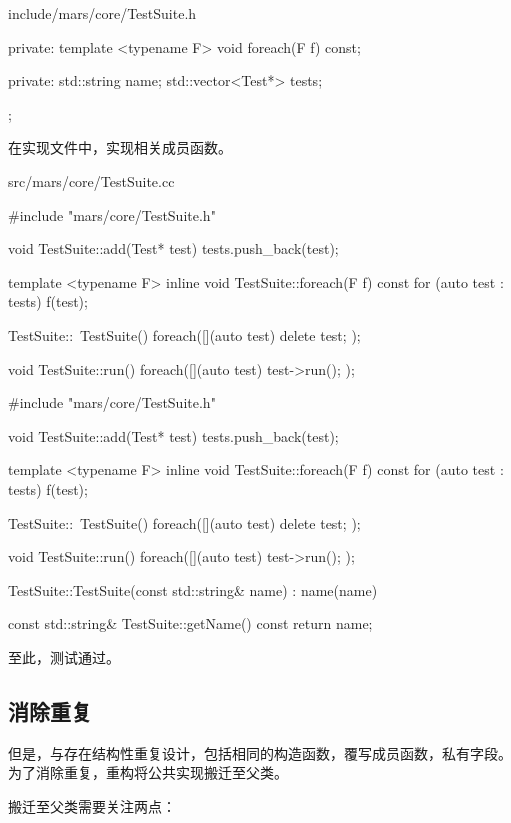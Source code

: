 \begin{content}
\begin{diff}{include/mars/core/TestSuite.h}
\begin{minicpp}
{private:
  template <typename F>
  void foreach(F f) const;

private:
  std::string name;
  std::vector<Test*> tests;
};
 \end{minicpp}
\end{diff}

在实现文件中，实现相关成员函数。

\begin{diff}{src/mars/core/TestSuite.cc}
 \begin{minicpp}
#include "mars/core/TestSuite.h"

void TestSuite::add(Test* test) {
  tests.push_back(test);
}

template <typename F>
inline void TestSuite::foreach(F f) const {
  for (auto test : tests) {
    f(test);
  }
}

TestSuite::~TestSuite() {
  foreach([](auto test) {
    delete test;
  });
}

void TestSuite::run() {
  foreach([](auto test) {
    test->run();
  });
}
 \end{minicpp}
\tcblower
 \begin{minicpp}
#include "mars/core/TestSuite.h"

void TestSuite::add(Test* test) {
  tests.push_back(test);
}

template <typename F>
inline void TestSuite::foreach(F f) const {
  for (auto test : tests) {
    f(test);
  }
}

TestSuite::~TestSuite() {
  foreach([](auto test) {
    delete test;
  });
}

void TestSuite::run() {
  foreach([](auto test) {
    test->run();
  });
}

TestSuite::TestSuite(const std::string& name)
  : name(name) {
}

const std::string& TestSuite::getName() const {
  return name;
}
 \end{minicpp}
\end{diff}

至此，测试通过。

\subsection{消除重复}

但是，与存在结构性重复设计，包括相同的构造函数，覆写成员函数，私有字段。为了消除重复，重构将公共实现搬迁至父类。

搬迁至父类需要关注两点：


\end{content}
